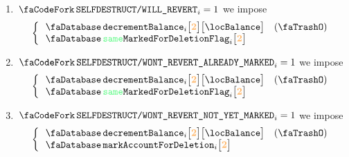 \begin{description}
\begin{enumerate}
				\[
					\accDecrementBalance {i}{\locFirstAccountRow}{\locBalance}
				\]
			\item \If $\scenSelfdestructWillRevert _{i} = 1$ \Then we impose
				\[
					\left\{ \begin{array}{lr}
						\accDecrementBalance                {i}{\locFirstAccountRow}{\locBalance} & (\trash) \\
						\accSameMarkedForDeletionFlag       {i}{\locFirstAccountRow} \\
					\end{array} \right.
				\]
			\item \If $\scenSelfdestructWontRevertAlreadyMarked _{i} = 1$ \Then we impose
				\[
					\left\{ \begin{array}{lr}
						\accDecrementBalance                {i}{\locFirstAccountRow}{\locBalance} & (\trash) \\
						\accSameMarkedForDeletionFlag       {i}{\locFirstAccountRow} \\
					\end{array} \right.
				\]
			\item \If $\scenSelfdestructWontRevertNotYetMarked _{i} = 1$ \Then we impose
				\[
					\left\{ \begin{array}{lr}
						\accDecrementBalance                {i}{\locFirstAccountRow}{\locBalance} & (\trash) \\
						\accTurnOnMarkedForDeletionFlag     {i}{\locFirstAccountRow} \\
					\end{array} \right.
				\]
		\end{enumerate}

\end{description}
